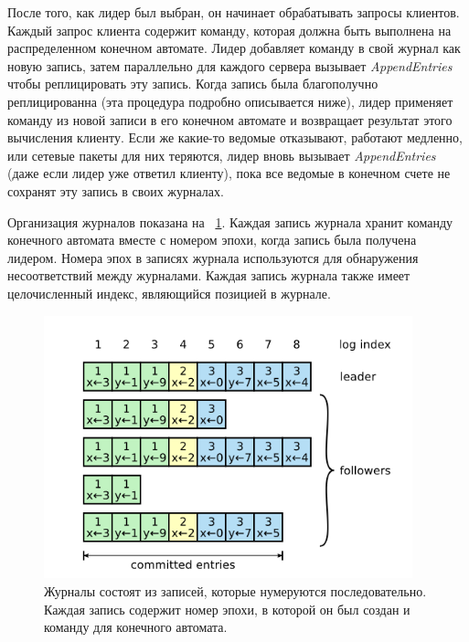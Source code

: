\documentclass[subf, href, colorlinks=true, 14pt,
times, mtpro, specialist]{disser}
\newcommand{\figref}[1]{\figurename~\ref{#1}}
\theoremstyle{definition}
\begin{document}
После того, как лидер был выбран, он начинает обрабатывать запросы клиентов. Каждый запрос клиента содержит команду, которая должна быть выполнена на распределенном конечном автомате. Лидер добавляет команду в свой журнал как новую запись, затем параллельно для каждого сервера вызывает \textit{AppendEntries} чтобы реплицировать эту запись. Когда запись была благополучно реплицированна (эта процедура подробно описывается ниже), лидер применяет команду из новой записи в его конечном автомате и возвращает результат этого вычисления клиенту. Если же какие-то ведомые отказывают, работают медленно, или сетевые пакеты для них теряются, лидер вновь вызывает \textit{AppendEntries} (даже если лидер уже ответил клиенту), пока все ведомые в конечном счете не сохранят эту запись в своих журналах.

Организация журналов показана на \figref{fig:log_1}. Каждая запись журнала хранит команду конечного автомата вместе с номером эпохи, когда запись была получена лидером. Номера эпох в записях журнала используются для обнаружения несоответствий между журналами. Каждая запись журнала также имеет целочисленный индекс, являющийся позицией в журнале.

\begin{figure}[H]
\centering
\includegraphics[width=0.95\textwidth]{src/pics/log_1.png}
\caption{Журналы состоят из записей, которые нумеруются последовательно. Каждая запись содержит номер эпохи, в которой он был создан и команду для конечного автомата.}
\label{fig:log_1}
\end{figure}
\end{document}
